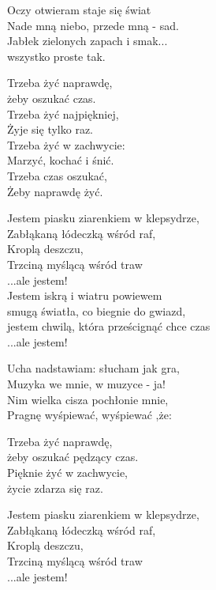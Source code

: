 \begin{text}
    Oczy otwieram staje się świat\\
    Nade mną niebo, przede mną - sad.\\
    Jabłek zielonych zapach i smak...\\
    wszystko proste tak.

    Trzeba żyć naprawdę,\\
    żeby oszukać czas.\\
    Trzeba żyć najpiękniej,\\
    Żyje się tylko raz.\\
    Trzeba żyć w zachwycie:\\
    Marzyć, kochać i śnić.\\
    Trzeba czas oszukać,\\
    Żeby naprawdę żyć.

    Jestem piasku ziarenkiem w klepsydrze,\\
    Zabłąkaną łódeczką wśród raf,\\
    Kroplą deszczu,\\
    Trzciną myślącą wśród traw\\
    ...ale jestem!\\
    Jestem iskrą i wiatru powiewem\\
    smugą światła, co biegnie do gwiazd,\\
    jestem chwilą, która prześcignąć chce czas\\
    ...ale jestem!

    Ucha nadstawiam: słucham jak gra,\\
    Muzyka we mnie, w muzyce - ja!\\
    Nim wielka cisza pochłonie mnie,\\
    Pragnę wyśpiewać, wyśpiewać ,że:

    Trzeba żyć naprawdę,\\
    żeby oszukać pędzący czas.\\
    Pięknie żyć w zachwycie,\\
    życie zdarza się raz.

    Jestem piasku ziarenkiem w klepsydrze,\\
    Zabłąkaną łódeczką wśród raf,\\
    Kroplą deszczu,\\
    Trzciną myślącą wśród traw\\
    ...ale jestem!


\end{text}
